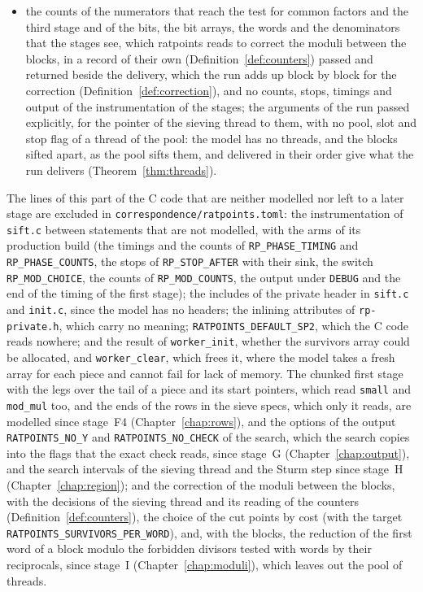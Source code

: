 \begin{itemize}
    returns those of all the sieve entries, the reserve of the correction included
    (Definition~\ref{def:choice});
  \item the counts of the numerators that reach the test for common factors and the third stage and
    of the bits, the bit arrays, the words and the denominators that the stages see, which ratpoints
    reads to correct the moduli between the blocks, in a record of their own
    (Definition~\ref{def:counters}) passed and returned beside the delivery, which the run adds up
    block by block for the correction (Definition~\ref{def:correction}), and no counts, stops,
    timings and output of the instrumentation of the stages; the arguments of the run passed
    explicitly, for the pointer of the sieving thread to them, with no pool, slot and stop flag of a
    thread of the pool: the model has no threads, and the blocks sifted apart, as the pool sifts
    them, and delivered in their order give what the run delivers (Theorem~\ref{thm:threads}).
\end{itemize}
The lines of this part of the C code that are neither modelled nor left to a later stage are
excluded in \verb|correspondence/ratpoints.toml|: the instrumentation of \verb|sift.c| between
statements that are not modelled, with the arms of its production build (the timings and the counts
of \verb|RP_PHASE_TIMING| and \verb|RP_PHASE_COUNTS|, the stops of \verb|RP_STOP_AFTER| with their
sink, the switch \verb|RP_MOD_CHOICE|, the counts of \verb|RP_MOD_COUNTS|, the output under
\verb|DEBUG| and the end of the timing of the first stage); the includes of the private header in
\verb|sift.c| and \verb|init.c|, since the model has no headers; the inlining attributes of
\verb|rp-private.h|, which carry no meaning; \verb|RATPOINTS_DEFAULT_SP2|, which the C code reads
nowhere; and the result of \verb|worker_init|, whether the survivors array could be allocated, and
\verb|worker_clear|, which frees it, where the model takes a fresh array for each piece and cannot
fail for lack of memory. The chunked first stage with the legs over the tail of a piece and its
start pointers, which read \verb|small| and \verb|mod_mul| too, and the ends of the rows in the
sieve specs, which only it reads, are modelled since stage~F4 (Chapter~\ref{chap:rows}), and the
options of the output \verb|RATPOINTS_NO_Y| and \verb|RATPOINTS_NO_CHECK| of the search, which the
search copies into the flags that the exact check reads, since stage~G (Chapter~\ref{chap:output}),
and the search intervals of the sieving thread and the Sturm step since stage~H
(Chapter~\ref{chap:region}); and the correction of the moduli between the blocks, with the decisions
of the sieving thread and its reading of the counters (Definition~\ref{def:counters}), the choice of
the cut points by cost (with the target \verb|RATPOINTS_SURVIVORS_PER_WORD|), and, with the blocks,
the reduction of the first word of a block modulo the forbidden divisors tested with words by their
reciprocals, since stage~I (Chapter~\ref{chap:moduli}), which leaves out the pool of threads.

